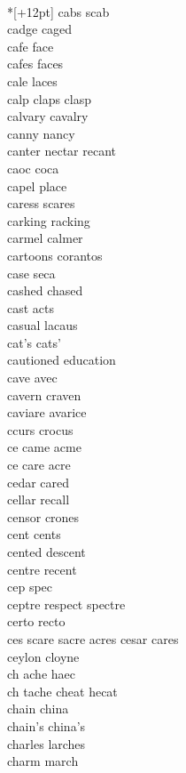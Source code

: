 \vspace{14pt}
\noindent\notextbf{\LargeC}\\*[+12pt]
cabs scab\\
cadge caged\\
cafe face\\
cafes faces\\
cale laces \\
calp claps clasp \\
calvary cavalry\\
canny nancy\\
canter nectar recant\\
caoc coca\\
capel place\\
caress scares\\
carking racking\\
carmel calmer\\
cartoons corantos\\
case seca\\
cashed chased\\
cast acts\\
casual lacaus\\
cat's cats'\\
cautioned education\\
cave avec\\
cavern craven\\
caviare avarice\\
ccurs crocus \\
ce came acme  \\
ce care acre  \\
cedar cared\\
cellar recall\\
censor crones\\
cent cents \\
cented descent \\
centre recent\\
cep spec \\
ceptre respect spectre \\
certo recto\\
ces scare sacre acres cesar cares  \\
ceylon cloyne\\
ch ache haec  \\
ch tache cheat hecat   \\
chain china\\
chain's china's\\
charles larches\\
charm march\\
